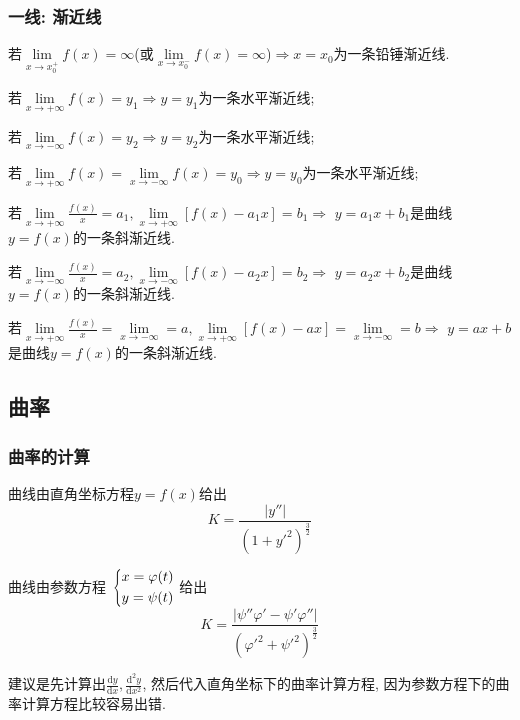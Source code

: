 \subsubsection{一线: 渐近线}
\par \vspace{.5em}
若$ \lim\limits_{x\rightarrow x_{0}^{+}}f(x)=\infty $(或$ \lim\limits_{x\rightarrow x_{0}^{-}}f(x)=\infty $)$ \Rightarrow x=x_{0} $为一条铅锤渐近线.\par \vspace{.5em}
\par \vspace{.5em}
若$ \lim\limits_{x\rightarrow +\infty}f(x)=y_{1}\Rightarrow y=y_{1} $为一条水平渐近线; \par 若$ \lim\limits_{x\rightarrow -\infty}f(x)=y_{2}\Rightarrow y=y_{2} $为一条水平渐近线;\par
若$ \lim\limits_{x\rightarrow +\infty}f(x)=\lim\limits_{x\rightarrow -\infty}f(x)=y_{0}\Rightarrow y=y_{0} $为一条水平渐近线;\par \vspace{.5em}
\par \vspace{.5em}
若$ \lim\limits_{x\rightarrow +\infty}\frac{f(x)}{x}=a_{1}, \lim\limits_{x\rightarrow +\infty}[f(x)-a_{1}x]=b_{1}\Rightarrow $ $ y=a_{1}x+b_{1} $是曲线$ y=f(x) $的一条斜渐近线. \par
若$ \lim\limits_{x\rightarrow -\infty}\frac{f(x)}{x}=a_{2}, \lim\limits_{x\rightarrow -\infty}[f(x)-a_{2}x]=b_{2}\Rightarrow $ $ y=a_{2}x+b_{2} $是曲线$ y=f(x) $的一条斜渐近线. \par
若$ \lim\limits_{x\rightarrow +\infty}\frac{f(x)}{x}=\lim\limits_{x\rightarrow -\infty}=a, \lim\limits_{x\rightarrow +\infty}[f(x)-ax]=\lim\limits_{x\rightarrow -\infty}=b\Rightarrow $ $ y=ax+b $是曲线$ y=f(x) $的一条斜渐近线. \par
\subsection{曲率}
\subsubsection{曲率的计算}
{\kaishu 曲线由直角坐标方程$ y=f(x) $给出}
\begin{equation*}
K=\frac{|y''|}{(1+y'^{2})^{\frac{3}{2}}}
\end{equation*}\par \vspace{.5em}
{\kaishu 曲线由参数方程\ }$
\scaleleftright[6pt]{\biggl\{}{
\begin{aligned}
& x=\varphi(t) \\
& y=\psi(t)
\end{aligned} }{.} $ {\kaishu 给出}
\begin{equation*}
K=\frac{|\psi''\varphi'-\psi'\varphi''|}{(\varphi'^{2}+\psi'^{2})^{\frac{3}{2}}}
\end{equation*}\par
建议是先计算出$ \frac{\mathrm{d}y}{\mathrm{d}x}, \frac{\mathrm{d}^{2}y}{\mathrm{d}x^{2}} $, 然后代入直角坐标下的曲率计算方程, 因为参数方程下的曲率计算方程比较容易出错.
